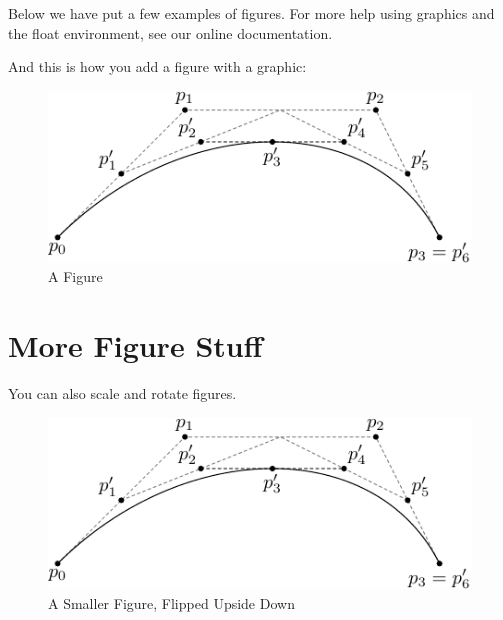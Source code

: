 \documentclass[12pt,twoside]{reedthesis}
\begin{document}
Below we have put a few examples of figures. For more help using graphics and the float environment, see our online documentation.

And this is how you add a figure with a graphic:
\begin{figure}[h]

	\centering
	\includegraphics{subdivision}
	\caption{A Figure}
	\label{subd}
\end{figure}

\clearpage %

\section{More Figure Stuff}
You can also scale and rotate figures.
\begin{figure}[h!]

	\centering
	\includegraphics[scale=0.5,angle=180]{subdivision}
	\caption{A Smaller Figure, Flipped Upside Down}
	\label{subd2}
\end{figure}
\end{document}
